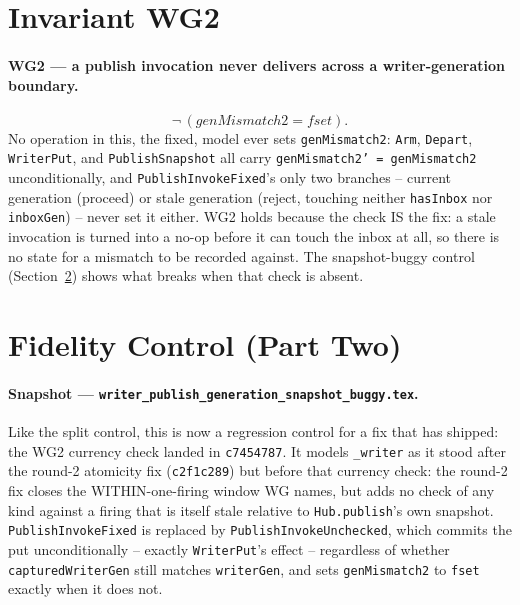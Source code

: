 \documentclass[a4paper,10pt,fleqn]{article}
\begin{document}
\section{Invariant WG2}
\label{sec:inv2}

\paragraph{WG2 --- a publish invocation never delivers across a writer-generation
boundary.}
\[
  \lnot\, (genMismatch2 = fset).
\]
No operation in this, the fixed, model ever sets \texttt{genMismatch2}:
\texttt{Arm}, \texttt{Depart}, \texttt{WriterPut}, and
\texttt{PublishSnapshot} all carry \texttt{genMismatch2' = genMismatch2}
unconditionally, and \texttt{PublishInvokeFixed}'s only two branches --
current generation (proceed) or stale generation (reject, touching neither
\texttt{hasInbox} nor \texttt{inboxGen}) -- never set it either. WG2 holds
because the check IS the fix: a stale invocation is turned into a no-op
before it can touch the inbox at all, so there is no state for a mismatch to
be recorded against. The snapshot-buggy control
(Section~\ref{sec:fidelity2}) shows what breaks when that check is absent.

\section{Fidelity Control (Part Two)}
\label{sec:fidelity2}

\paragraph{Snapshot --- \texttt{writer\_publish\_generation\_snapshot\_buggy.tex}.}
Like the split control, this is now a regression control for a fix that has
shipped: the WG2 currency check landed in \texttt{c7454787}. It models
\texttt{\_writer} as it stood after the round-2 atomicity fix
(\texttt{c2f1c289}) but before that currency check: the round-2 fix
closes the WITHIN-one-firing window WG names, but adds no check of any kind
against a firing that is itself stale relative to \texttt{Hub.publish}'s own
snapshot. \texttt{PublishInvokeFixed} is replaced by
\texttt{PublishInvokeUnchecked}, which commits the put unconditionally --
exactly \texttt{WriterPut}'s effect -- regardless of whether
\texttt{capturedWriterGen} still matches \texttt{writerGen}, and sets
\texttt{genMismatch2} to \texttt{fset} exactly when it does not.
\end{document}

